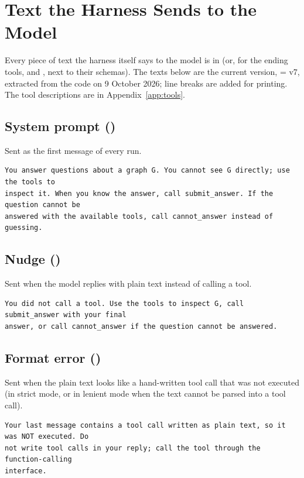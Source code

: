 \chapter{Text the Harness Sends to the Model}
\label{app:prompts}

Every piece of text the harness itself says to the model is in  (or, for the ending tools,
 and , next to their schemas). The texts below are the current version,
 = v7, extracted from the code on 9 October 2026; line breaks are added for
printing. The tool descriptions are in Appendix~\ref{app:tools}.


\section*{System prompt ()}
Sent as the first message of every run.
\begin{lstlisting}
You answer questions about a graph G. You cannot see G directly; use the tools to
inspect it. When you know the answer, call submit_answer. If the question cannot be
answered with the available tools, call cannot_answer instead of guessing.
\end{lstlisting}

\section*{Nudge ()}
Sent when the model replies with plain text instead of calling a tool.
\begin{lstlisting}
You did not call a tool. Use the tools to inspect G, call submit_answer with your final
answer, or call cannot_answer if the question cannot be answered.
\end{lstlisting}

\section*{Format error ()}
Sent when the plain text looks like a hand-written tool call that was not executed (in strict mode, or in lenient mode when the text cannot be parsed into a tool call).
\begin{lstlisting}
Your last message contains a tool call written as plain text, so it was NOT executed. Do
not write tool calls in your reply; call the tool through the function-calling
interface.
\end{lstlisting}

